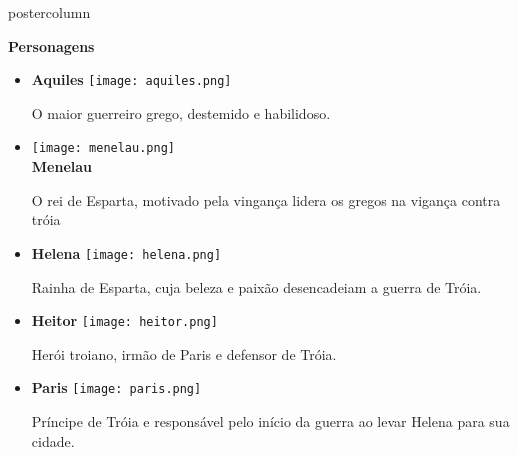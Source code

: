 \documentclass[final,hyperref={pdfpagelabels=false}]{beamer}
\begin{document}
\begin{frame}
\begin{columns}
\begin{column}{.49\textwidth}
\begin{beamercolorbox}[center,wd=\textwidth]{postercolumn}
\begin{minipage}[T]{.85\textwidth}
{                        %
                       \begin{block}{\textbf{Personagens}}
    \begin{itemize}
      \item \begin{minipage}[t]{0.2\textwidth}
                \centering
                 \textbf{Aquiles}
                 \vspace{1cm} %
                \texttt{[image: aquiles.png]} \\
              \end{minipage} 
              O maior guerreiro grego, destemido e habilidoso.
        \vspace{1cm} %
        \item \begin{minipage}[t]{0.2\textwidth}
                \centering
                \hspace{4cm} %
                \texttt{[image: menelau.png]} \\
                \textbf{Menelau}
              \end{minipage} 
              O rei de Esparta, motivado pela vingança lidera os gregos na vigança contra tróia
        \vspace{1cm} %
        \item \begin{minipage}[t]{0.2\textwidth}
                \centering
                \textbf{Helena}
                \texttt{[image: helena.png]} \\
              \end{minipage} 
             Rainha de Esparta, cuja beleza e paixão desencadeiam a guerra de Tróia.
        \vspace{1cm} %
        \item \begin{minipage}[t]{0.2\textwidth}
                \centering
                \textbf{Heitor}
                \texttt{[image: heitor.png]} \\
              \end{minipage} 
             Herói troiano, irmão de Paris e defensor de Tróia.
        \vspace{1cm} %
        \item \begin{minipage}[t]{0.2\textwidth}
                \centering
                \textbf{Paris}
                \texttt{[image: paris.png]} 
              \end{minipage} 
              Príncipe de Tróia e responsável pelo início da guerra ao levar Helena para sua cidade. 
    \end{itemize}
\end{block}

}
\end{minipage}
\end{beamercolorbox}
\end{column}
\end{columns}
\end{frame}
\end{document}
